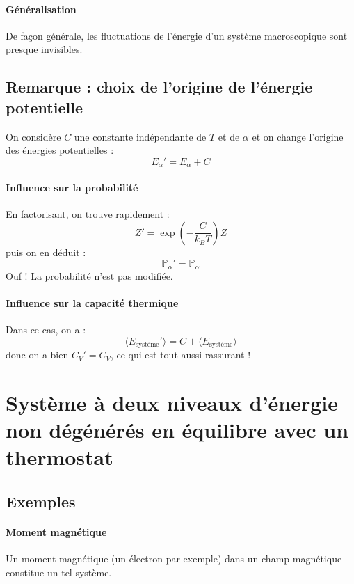 \documentclass[french]{book}
\theoremstyle{plain}
\theoremstyle{definition}
\theoremstyle{remark}
\renewcommand{\P}{\mathbb{P}}
\begin{document}
\paragraph{Généralisation} De façon générale, les fluctuations de l'énergie d'un système macroscopique sont presque invisibles.

\subsection{Remarque : choix de l'origine de l'énergie potentielle}

On considère $C$ une constante indépendante de $T$ et de $\alpha$ et on change l'origine des énergies potentielles : $$E_\alpha'=E_\alpha+C$$

\paragraph{Influence sur la probabilité} En factorisant, on trouve rapidement : $$Z'=\exp\left(-\frac{C}{k_BT}\right)Z$$ puis on en déduit : $$\P_\alpha'=\P_\alpha$$ Ouf ! La probabilité n'est pas modifiée.

\paragraph{Influence sur la capacité thermique} Dans ce cas, on a : $$\langle E_\text{système}'\rangle=C+\langle E_\text{système}\rangle$$ donc on a bien $C_V'=C_V$, ce qui est tout aussi rassurant !

\section{Système à deux niveaux d'énergie non dégénérés en équilibre avec un thermostat}

\subsection{Exemples}

\paragraph{Moment magnétique} Un moment magnétique (un électron par exemple) dans un champ magnétique constitue un tel système.
\end{document}
